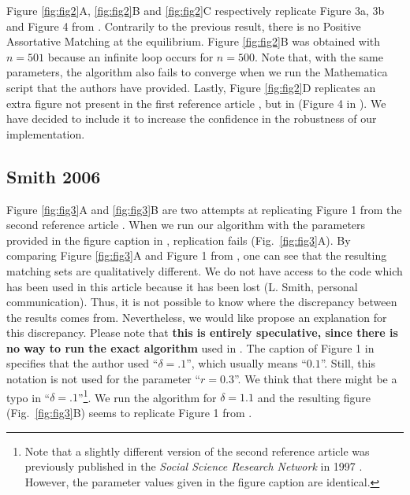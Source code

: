 Figure \ref{fig:fig2}A, \ref{fig:fig2}B and \ref{fig:fig2}C respectively replicate Figure 3a, 3b and Figure 4 from \citep{shimer_assortative_2000}. Contrarily to the previous result, there is no Positive Assortative Matching at the equilibrium. Figure \ref{fig:fig2}B was obtained with $n=501$ because an infinite loop occurs for $n=500$. Note that, with the same parameters, the algorithm also fails to converge when we run the Mathematica script that the authors have provided. Lastly, Figure \ref{fig:fig2}D replicates an extra figure not present in the first reference article \citep{shimer_assortative_2000}, but in \citep{smith_frictional_2011} (Figure 4 in \citep{smith_frictional_2011}). We have decided to include it to increase the confidence in the robustness of our implementation.



\subsection*{Smith 2006}

Figure \ref{fig:fig3}A and \ref{fig:fig3}B are two attempts at replicating Figure 1 from the second reference article \citep{smith_marriage_2006}. When we run our algorithm with the parameters provided in the figure caption in \citep{smith_marriage_2006}, replication fails (Fig.~\ref{fig:fig3}A). By comparing Figure \ref{fig:fig3}A and Figure 1 from \citep{smith_marriage_2006}, one can see that the resulting matching sets are qualitatively different. We do not have access to the code which has been used in this article because it has been lost (L. Smith, personal communication). Thus, it is not possible to know where the discrepancy between the results comes from. Nevertheless, we would like propose an explanation for this discrepancy. Please note that \textbf{this is entirely speculative, since there is no way to run the exact algorithm} used in \citep{smith_marriage_2006}. The caption of Figure 1 in \citep{smith_marriage_2006} specifies that the author used ``$\delta=.1$'', which usually means ``$0.1$''. Still, this notation is not used for the parameter ``$r=0.3$''. We think that there might be a typo in ``$\delta=.1$''\footnote{Note that a slightly different version of the second reference article \citep{smith_marriage_2006} was previously published in the \textit{Social Science Research Network} in 1997 \citep{smith_marriage_1997}. However, the parameter values given in the figure caption are identical.}. We run the algorithm for $\delta=1.1$ and the resulting figure (Fig.~\ref{fig:fig3}B) seems to replicate Figure 1 from \citep{smith_marriage_2006}.

